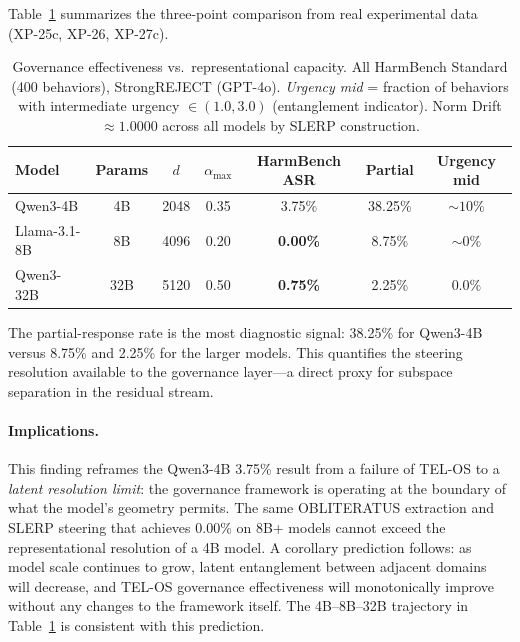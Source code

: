 \documentclass{article}
\begin{document}
Table~\ref{tab:rep_capacity} summarizes the three-point comparison from
real experimental data (XP-25c, XP-26, XP-27c).

\begin{table}[ht]
\centering
\caption{Governance effectiveness vs.\ representational capacity.
  All HarmBench Standard (400 behaviors), StrongREJECT (GPT-4o).
  \textit{Urgency mid} = fraction of behaviors with intermediate urgency
  $\in (1.0, 3.0)$ (entanglement indicator).
  Norm Drift $\approx 1.0000$ across all models by SLERP construction.}
\label{tab:rep_capacity}
\small
\begin{tabular}{lcccccc}
\toprule
\textbf{Model} & \textbf{Params} & $d$ & $\alpha_{\max}$ &
  \textbf{HarmBench ASR} & \textbf{Partial} & \textbf{Urgency mid} \\
\midrule
Qwen3-4B           & 4B  & 2048 & 0.35 & 3.75\%          & 38.25\% & ${\sim}10\%$ \\
Llama-3.1-8B       & 8B  & 4096 & 0.20 & \textbf{0.00\%} &  8.75\% & ${\sim}0\%$  \\
Qwen3-32B          & 32B & 5120 & 0.50 & \textbf{0.75\%} &  2.25\% & $0.0\%$      \\
\bottomrule
\end{tabular}
\end{table}

The partial-response rate is the most diagnostic signal: 38.25\% for Qwen3-4B
versus 8.75\% and 2.25\% for the larger models. This quantifies the steering
resolution available to the governance layer---a direct proxy for subspace
separation in the residual stream.

\paragraph{Implications.}
This finding reframes the Qwen3-4B 3.75\% result from a failure of TEL-OS to
a \textit{latent resolution limit}: the governance framework is operating at
the boundary of what the model's geometry permits. The same OBLITERATUS
extraction and SLERP steering that achieves 0.00\% on 8B+ models cannot exceed
the representational resolution of a 4B model. A corollary prediction follows:
as model scale continues to grow, latent entanglement between adjacent domains
will decrease, and TEL-OS governance effectiveness will monotonically improve
without any changes to the framework itself. The 4B--8B--32B trajectory in
Table~\ref{tab:rep_capacity} is consistent with this prediction.

\end{document}
